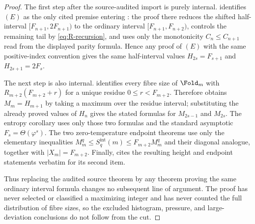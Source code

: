 \begin{proof}
The first step after the source-audited import is purely internal.
 identifies \((E)\) as the
only cited premise entering :
the proof there reduces the shifted half-interval
\([F_{n+1},2F_{n+1})\) to the ordinary interval \([F_{n+1},F_{n+2})\), controls the
remaining tail by \eqref{eq:R-recursion}, and uses only the monotonicity
\(C_n\le C_{n+1}\) read from the displayed parity formula.  Hence any proof of
\((E)\) with the same positive-index convention gives the same half-interval
values \(H_{2s}=F_{s+1}\) and \(H_{2s+1}=2F_s\).

The next step is also internal.  
identifies every fibre size of \(\Fold_m\) with
\(R_{m+2}(F_{m+2}+r)\) for a unique residue \(0\le r<F_{m+2}\).  Therefore
 obtains
\(M_m=H_{m+1}\) by taking a maximum over the residue interval; substituting the
already proved values of \(H_n\) gives the stated formulas for \(M_{2s-1}\) and
\(M_{2s}\).  The entropy corollary uses only those two formulas and the standard
asymptotic \(F_s=\Theta(\varphi^s)\).  The two zero-temperature endpoint theorems
use only the elementary inequalities
\(M_m^q\le S_q^{\mathrm{int}}(m)\le F_{m+2}M_m^q\) and their diagonal analogue,
together with \(|X_m|=F_{m+2}\).  Finally,
 cites the resulting height and endpoint
statements verbatim for its second item.

Thus replacing the audited source theorem by any theorem proving the same
ordinary interval formula changes no subsequent line of argument.  The proof has
never selected or classified a maximizing integer and has never counted the full
distribution of fibre sizes, so the excluded histogram, pressure, and
large-deviation conclusions do not follow from the cut.
\end{proof}

